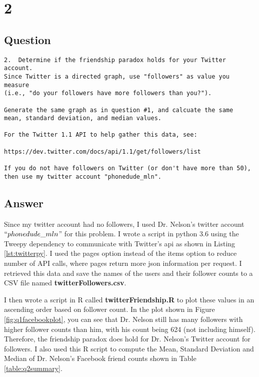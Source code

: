 \documentclass[letterpaper,11pt]{article}
\begin{document}
\clearpage


\section*{2}

\subsection*{Question}

\begin{verbatim}
2.  Determine if the friendship paradox holds for your Twitter account.
Since Twitter is a directed graph, use "followers" as value you measure
(i.e., "do your followers have more followers than you?").

Generate the same graph as in question #1, and calcuate the same 
mean, standard deviation, and median values.

For the Twitter 1.1 API to help gather this data, see:

https://dev.twitter.com/docs/api/1.1/get/followers/list

If you do not have followers on Twitter (or don't have more than 50),
then use my twitter account "phonedude_mln".
\end{verbatim}

\clearpage
\subsection*{Answer}

Since my twitter account had no followers, I used Dr. Nelson's twitter account $``phonedude\_mln$'' for this problem. I wrote a script in python 3.6 using the Tweepy dependency to communicate with Twitter's api as shown in Listing \ref{lst:twitterpy}. I used the pages option instead of the items option to reduce number of API calls, where pages return more json information per request. I retrieved this data and save the names of the users and their follower counts to a CSV file named \textbf{twitterFollowers.csv}.

I then wrote a script in R called \textbf{twitterFriendship.R} to plot these values in an ascending order based on follower count. In the plot shown in Figure \ref{fig:q1facebookplot}, you can see that Dr. Nelson still has many followers with higher follower counts than him, with his count being 624 (not including himself). Therefore, the friendship paradox does hold for Dr. Nelson's Twitter account for followers. I also used this R script to compute the Mean, Standard Deviation and Median of Dr. Nelson's Facebook friend counts shown in Table \ref{table:q2summary}. 
\end{document}
